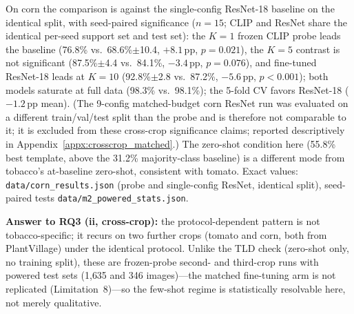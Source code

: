 \documentclass[10pt,a4paper]{article}
\begin{document}
On corn the comparison is against the single-config ResNet-18 baseline on the identical split, with seed-paired significance ($n{=}15$; CLIP and ResNet share the identical per-seed support set and test set): the $K{=}1$ frozen CLIP probe leads the baseline (76.8\% vs.\ 68.6\%$\pm$10.4, $+8.1$\,pp, $p{=}0.021$), the $K{=}5$ contrast is not significant (87.5\%$\pm$4.4 vs.\ 84.1\%, $-3.4$\,pp, $p{=}0.076$), and fine-tuned ResNet-18 leads at $K{=}10$ (92.8\%$\pm$2.8 vs.\ 87.2\%, $-5.6$\,pp, $p{<}0.001$); both models saturate at full data (98.3\% vs.\ 98.1\%); the 5-fold CV favors ResNet-18 ($-1.2$\,pp mean). (The 9-config matched-budget corn ResNet run was evaluated on a different train/val/test split than the probe and is therefore not comparable to it; it is excluded from these cross-crop significance claims; reported descriptively in Appendix~\ref{appx:crosscrop_matched}.) The zero-shot condition here (55.8\% best template, above the 31.2\% majority-class baseline) is a different mode from tobacco's at-baseline zero-shot, consistent with tomato. Exact values: \texttt{data/corn\_results.json} (probe and single-config ResNet, identical split), seed-paired tests \texttt{data/m2\_powered\_stats.json}.

\textbf{Answer to RQ3 (ii, cross-crop):} the protocol-dependent pattern is not tobacco-specific; it recurs on two further crops (tomato and corn, both from PlantVillage) under the identical protocol. Unlike the TLD check (zero-shot only, no training split), these are frozen-probe second- and third-crop runs with powered test sets (1{,}635 and 346 images)---the matched fine-tuning arm is not replicated (Limitation~8)---so the few-shot regime is statistically resolvable here, not merely qualitative.
\end{document}
